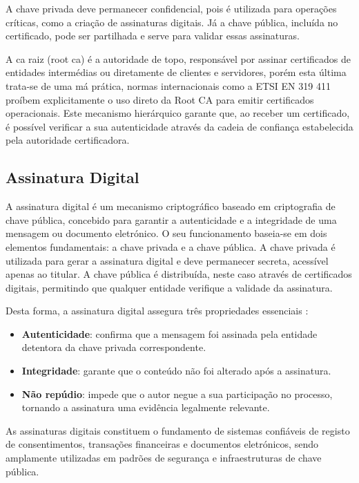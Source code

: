 A chave privada deve permanecer confidencial, pois é utilizada para operações críticas, como a criação de assinaturas digitais. Já a chave pública, incluída no certificado, pode ser partilhada e serve para validar essas assinaturas.

A \acrshort{ca} raiz (root \acrshort{ca}) é a autoridade de topo, responsável por assinar certificados de entidades intermédias ou diretamente de clientes e servidores, porém esta última trata-se de uma má prática, normas internacionais como a ETSI EN 319 411 \citep{ETSI_EN_319_411_1} proíbem explicitamente o uso direto da Root CA para emitir certificados operacionais. Este mecanismo hierárquico garante que, ao receber um certificado, é possível verificar a sua autenticidade através da cadeia de confiança estabelecida pela autoridade certificadora.

\subsection{Assinatura Digital}

A assinatura digital é um mecanismo criptográfico baseado em criptografia de chave pública, concebido para garantir a autenticidade e a integridade de uma mensagem ou documento eletrónico. O seu funcionamento baseia-se em dois elementos fundamentais: a chave privada e a chave pública. A chave privada é utilizada para gerar a assinatura digital e deve permanecer secreta, acessível apenas ao titular. A chave pública é distribuída, neste caso através de certificados digitais, permitindo que qualquer entidade verifique a validade da assinatura.

Desta forma, a assinatura digital assegura três propriedades essenciais \citep{digitalsignatures}:
\begin{itemize}
    \item \textbf{Autenticidade}: confirma que a mensagem foi assinada pela entidade detentora da chave privada correspondente.
    \item \textbf{Integridade}: garante que o conteúdo não foi alterado após a assinatura.
    \item \textbf{Não repúdio}: impede que o autor negue a sua participação no processo, tornando a assinatura uma evidência legalmente relevante.
\end{itemize}

As assinaturas digitais constituem o fundamento de sistemas confiáveis de registo de consentimentos, transações financeiras e documentos eletrónicos, sendo amplamente utilizadas em padrões de segurança e infraestruturas de chave pública.

